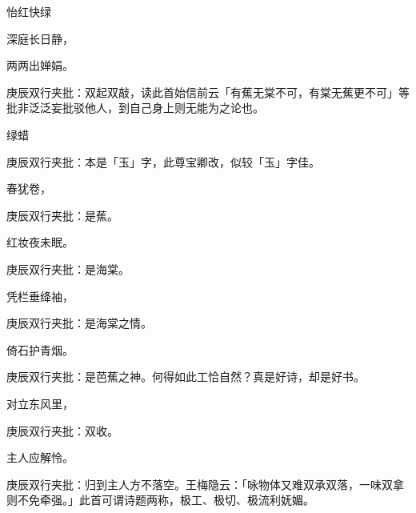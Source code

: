 \begin{poem}

    \begin{pl}怡红快绿\end{pl}

    \begin{pl}深庭长日静，\end{pl}

    \begin{pl}两两出婵娟。\end{pl}\begin{note}庚辰双行夹批：双起双敲，读此首始信前云「有蕉无棠不可，有棠无蕉更不可」等批非泛泛妄批驳他人，到自己身上则无能为之论也。\end{note}

    \begin{pl}绿蜡\end{pl}\begin{note}庚辰双行夹批：本是「玉」字，此尊宝卿改，似较「玉」字佳。\end{note}\begin{pl}春犹卷，\end{pl}\begin{note}庚辰双行夹批：是蕉。\end{note}

    \begin{pl}红妆夜未眠。\end{pl}\begin{note}庚辰双行夹批：是海棠。\end{note}

    \begin{pl}凭栏垂绛袖，\end{pl}\begin{note}庚辰双行夹批：是海棠之情。\end{note}

    \begin{pl}倚石护青烟。\end{pl}\begin{note}庚辰双行夹批：是芭蕉之神。何得如此工恰自然？真是好诗，却是好书。\end{note}

    \begin{pl}对立东风里，\end{pl}\begin{note}庚辰双行夹批：双收。\end{note}

    \begin{pl}主人应解怜。\end{pl}\begin{note}庚辰双行夹批：归到主人方不落空。王梅隐云：「咏物体又难双承双落，一味双拿则不免牵强。」此首可谓诗题两称，极工、极切、极流利妩媚。\end{note}

\end{poem}

